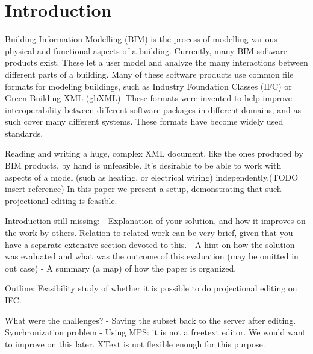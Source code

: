 


\setcounter{page}{1}
\section{Introduction}
Building Information Modelling (BIM) is the process of modelling various physical and functional aspects of a building\cite{clar:eke}. Currently, many BIM software products exist. These let a user model and analyze the many interactions between different parts of a building. Many of these software products use common file formats for modeling buildings, such as Industry Foundation Classes (IFC) or Green Building XML (gbXML). These formats were invented to help improve interoperability between different software packages in different domains, and as such cover many different systems. These formats have become widely used standards.

Reading and writing a huge, complex XML document, like the ones produced by BIM products, by hand is unfeasible. It’s desirable to be able to work with aspects of a model (such as heating, or electrical wiring) independently.(TODO insert reference) In this paper we present a setup, demonstrating that such projectional editing is feasible.

Introduction still missing:
- Explanation of your solution, and how it improves on the work by others. Relation to related work can be very brief, given that you have a separate extensive section devoted to this.
- A hint on how the solution was evaluated and what was the outcome of this evaluation (may be omitted in out case)
- A summary (a map) of how the paper is organized.

\cite{nour08}

Outline:
Feasibility study of whether it is possible to do projectional editing on IFC.

What were the challenges?
- Saving the subset back to the server after editing. Synchronization problem
- Using MPS: it is not a freetext editor. We would want to improve on this later. XText is not flexible enough for this purpose.

